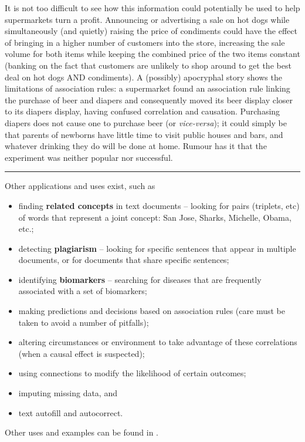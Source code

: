 \newl It is not too difficult to see how this information could potentially be used to help supermarkets turn a profit. Announcing or advertising a sale on hot dogs while simultaneously (and quietly) raising the price of condiments could have the effect of bringing in a higher number of customers into the store, increasing the sale volume for both items while keeping the combined price of the two items constant (banking on the fact that customers are unlikely to shop around to get the best deal on hot dogs AND condiments). 
\newl A (possibly) apocryphal story shows the limitations of association rules: a supermarket found an association rule linking the purchase of beer and diapers and consequently moved its beer display closer to its diapers display, having confused correlation and causation. Purchasing diapers does not cause one to purchase beer (or \textit{vice-versa}); it could simply be that parents of newborns have little time to visit public houses and bars, and whatever drinking they do will be done at home. Rumour has it that the experiment was neither popular nor successful.    
\begin{center}
    \rule{0.5\textwidth}{.4pt}
\end{center}
Other applications and uses exist, such as 
\begin{itemize}[noitemsep]
\item finding \textbf{related concepts} in text documents -- looking for pairs (triplets, etc) of words that represent a joint concept: 
{San Jose, Sharks}, {Michelle, Obama}, etc.;
\item detecting \textbf{plagiarism} -- looking for specific sentences that appear in multiple documents, or for documents that share specific sentences; 
\item identifying \textbf{biomarkers} -- searching for diseases that are frequently associated with a set of biomarkers;
\item making predictions and decisions based on association rules (care must be taken to avoid a number of pitfalls);
\item altering circumstances or environment to take advantage of these correlations (when a causal effect is suspected);
\item using connections to modify the likelihood of certain outcomes; 
\item imputing missing data, and 
\item text autofill and autocorrect.
\end{itemize}
Other uses and examples can be found in \cite{DSML_ES, DSML_BSHWJM, DSML_GRVC}.
